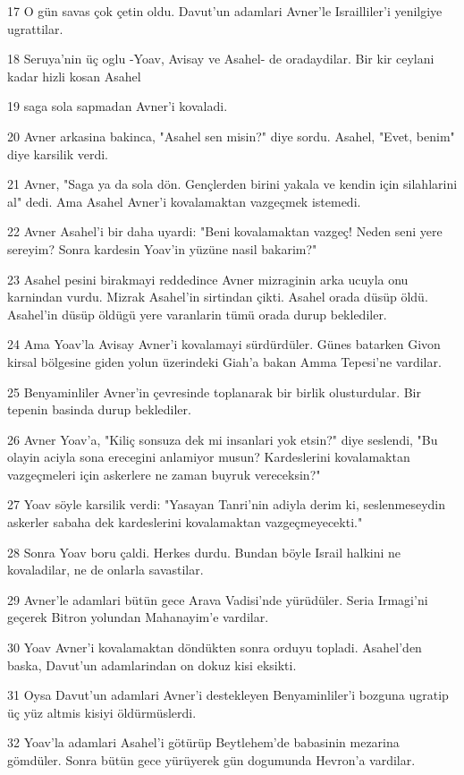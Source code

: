 \par 17 O gün savas çok çetin oldu. Davut'un adamlari Avner'le Israilliler'i yenilgiye ugrattilar.
\par 18 Seruya'nin üç oglu -Yoav, Avisay ve Asahel- de oradaydilar. Bir kir ceylani kadar hizli kosan Asahel
\par 19 saga sola sapmadan Avner'i kovaladi.
\par 20 Avner arkasina bakinca, "Asahel sen misin?" diye sordu. Asahel, "Evet, benim" diye karsilik verdi.
\par 21 Avner, "Saga ya da sola dön. Gençlerden birini yakala ve kendin için silahlarini al" dedi. Ama Asahel Avner'i kovalamaktan vazgeçmek istemedi.
\par 22 Avner Asahel'i bir daha uyardi: "Beni kovalamaktan vazgeç! Neden seni yere sereyim? Sonra kardesin Yoav'in yüzüne nasil bakarim?"
\par 23 Asahel pesini birakmayi reddedince Avner mizraginin arka ucuyla onu karnindan vurdu. Mizrak Asahel'in sirtindan çikti. Asahel orada düsüp öldü. Asahel'in düsüp öldügü yere varanlarin tümü orada durup beklediler.
\par 24 Ama Yoav'la Avisay Avner'i kovalamayi sürdürdüler. Günes batarken Givon kirsal bölgesine giden yolun üzerindeki Giah'a bakan Amma Tepesi'ne vardilar.
\par 25 Benyaminliler Avner'in çevresinde toplanarak bir birlik olusturdular. Bir tepenin basinda durup beklediler.
\par 26 Avner Yoav'a, "Kiliç sonsuza dek mi insanlari yok etsin?" diye seslendi, "Bu olayin aciyla sona erecegini anlamiyor musun? Kardeslerini kovalamaktan vazgeçmeleri için askerlere ne zaman buyruk vereceksin?"
\par 27 Yoav söyle karsilik verdi: "Yasayan Tanri'nin adiyla derim ki, seslenmeseydin askerler sabaha dek kardeslerini kovalamaktan vazgeçmeyecekti."
\par 28 Sonra Yoav boru çaldi. Herkes durdu. Bundan böyle Israil halkini ne kovaladilar, ne de onlarla savastilar.
\par 29 Avner'le adamlari bütün gece Arava Vadisi'nde yürüdüler. Seria Irmagi'ni geçerek Bitron yolundan Mahanayim'e vardilar.
\par 30 Yoav Avner'i kovalamaktan döndükten sonra orduyu topladi. Asahel'den baska, Davut'un adamlarindan on dokuz kisi eksikti.
\par 31 Oysa Davut'un adamlari Avner'i destekleyen Benyaminliler'i bozguna ugratip üç yüz altmis kisiyi öldürmüslerdi.
\par 32 Yoav'la adamlari Asahel'i götürüp Beytlehem'de babasinin mezarina gömdüler. Sonra bütün gece yürüyerek gün dogumunda Hevron'a vardilar.

